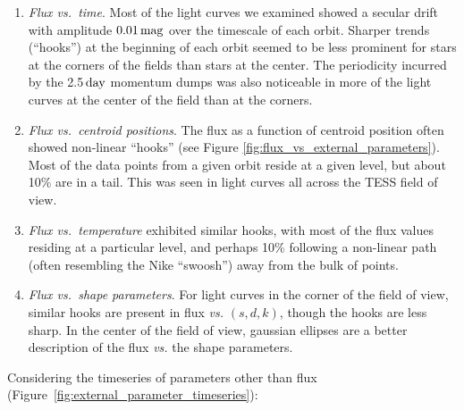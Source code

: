 \documentclass[12pt,twocolumn,tighten]{aastex62}
\begin{document}
\begin{enumerate}

\item {\it Flux vs.\ time}. Most of the light curves we examined showed a secular
    drift with amplitude $0.01\,{\rm mag}$ over the timescale of each
    orbit.  Sharper trends (``hooks'') at the beginning of each orbit
    seemed to be less prominent for stars at the corners of the fields
    than stars at the center.  The periodicity incurred by the
    2.5$\,{\rm day}$ momentum dumps was also noticeable in more of the
    light curves at the center of the field than at the corners.

\item {\it Flux vs.\ centroid positions}. The flux as a function of
  centroid position often showed non-linear ``hooks'' (see Figure
    \ref{fig:flux_vs_external_parameters}). Most of the data points from a 
    given orbit reside at a given
    level, but about 10\% are in a tail. This was seen in light curves
    all across the TESS field of view.

\item {\it Flux vs.\ temperature} exhibited similar hooks, with most of
  the flux values residing at a particular level, and perhaps 10\%
    following a non-linear path (often resembling the Nike ``swoosh'')
    away from the bulk of points.

\item {\it Flux vs.\ shape parameters}.  For light curves in the corner
  of the field of view, similar hooks are present in flux {\it vs.}
    $(s,d,k)$, though the hooks are less sharp.  In the center of the
    field of view, gaussian ellipses are a better description of the
    flux {\it vs.} the shape parameters.
    
\end{enumerate}

Considering the timeseries of parameters other than flux 
(Figure~\ref{fig:external_parameter_timeseries}):
\end{document}
